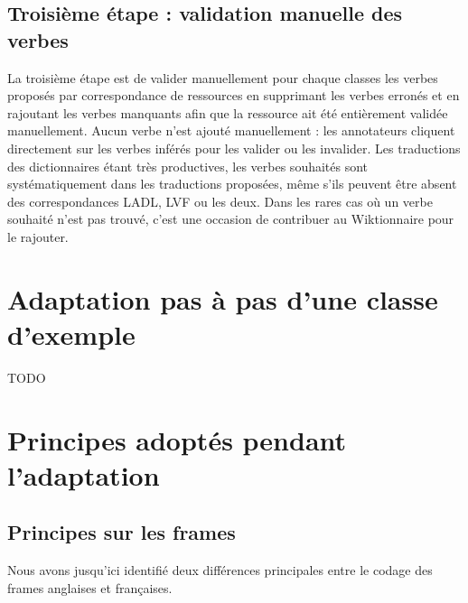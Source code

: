 \subsection{Troisième étape : validation manuelle des verbes}
\label{third}

La troisième étape  est de valider manuellement pour chaque classes les verbes
proposés par correspondance de ressources en supprimant les verbes erronés et
en rajoutant les verbes manquants afin que la ressource ait été entièrement
validée manuellement. Aucun verbe n'est ajouté manuellement : les annotateurs
cliquent directement sur les verbes inférés pour les valider ou les invalider.
Les traductions des dictionnaires étant très productives, les verbes souhaités
sont systématiquement dans les traductions proposées, même s'ils peuvent être
absent des correspondances LADL, LVF ou les deux. Dans les rares cas où un
verbe souhaité n'est pas trouvé, c'est une occasion de contribuer au
Wiktionnaire pour le rajouter.

\section{Adaptation pas à pas d'une classe d'exemple}

TODO

\section{Principes adoptés pendant l'adaptation}

\subsection{Principes sur les frames}\label{princp}

Nous avons jusqu'ici identifié deux différences principales entre le codage des
frames anglaises et françaises.


